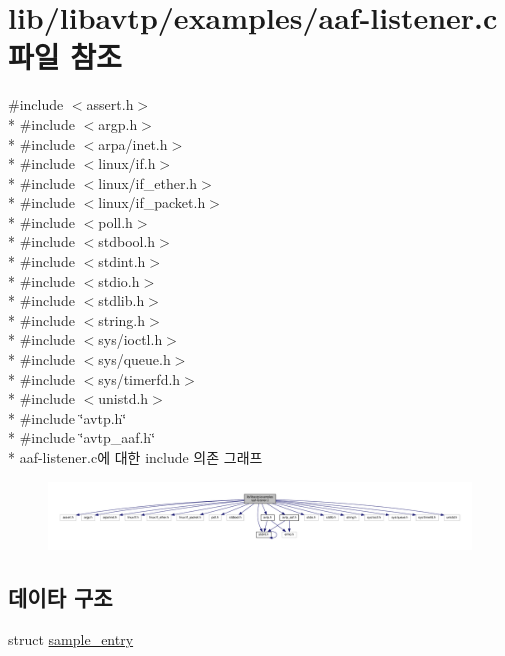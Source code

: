 \hypertarget{aaf-listener_8c}{}\section{lib/libavtp/examples/aaf-\/listener.c 파일 참조}
\label{aaf-listener_8c}
{\ttfamily \#include $<$assert.\+h$>$}\\*
{\ttfamily \#include $<$argp.\+h$>$}\\*
{\ttfamily \#include $<$arpa/inet.\+h$>$}\\*
{\ttfamily \#include $<$linux/if.\+h$>$}\\*
{\ttfamily \#include $<$linux/if\+\_\+ether.\+h$>$}\\*
{\ttfamily \#include $<$linux/if\+\_\+packet.\+h$>$}\\*
{\ttfamily \#include $<$poll.\+h$>$}\\*
{\ttfamily \#include $<$stdbool.\+h$>$}\\*
{\ttfamily \#include $<$stdint.\+h$>$}\\*
{\ttfamily \#include $<$stdio.\+h$>$}\\*
{\ttfamily \#include $<$stdlib.\+h$>$}\\*
{\ttfamily \#include $<$string.\+h$>$}\\*
{\ttfamily \#include $<$sys/ioctl.\+h$>$}\\*
{\ttfamily \#include $<$sys/queue.\+h$>$}\\*
{\ttfamily \#include $<$sys/timerfd.\+h$>$}\\*
{\ttfamily \#include $<$unistd.\+h$>$}\\*
{\ttfamily \#include \char`\"{}avtp.\+h\char`\"{}}\\*
{\ttfamily \#include \char`\"{}avtp\+\_\+aaf.\+h\char`\"{}}\\*
aaf-\/listener.c에 대한 include 의존 그래프
\nopagebreak
\begin{figure}[H]
\begin{center}
\leavevmode
\includegraphics[width=350pt]{aaf-listener_8c__incl}
\end{center}
\end{figure}
\subsection*{데이타 구조}
\begin{DoxyCompactItemize}
\item 
struct \hyperlink{structsample__entry}{sample\+\_\+entry}
\end{DoxyCompactItemize}
